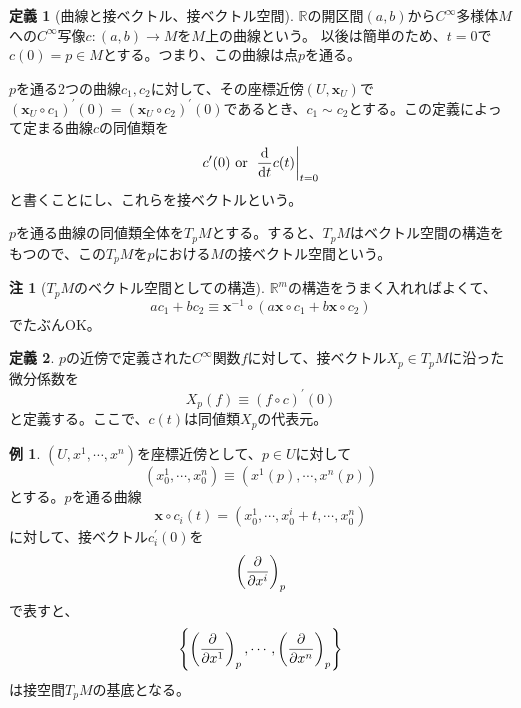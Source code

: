 \documentclass[unicode,a4paper,11pt]{ltjsarticle}
\theoremstyle{definition}
\newtheorem{dfn}{定義}[section]
\newtheorem{exm}{例}[section]
\newtheorem{rmk}{注}[section]
\begin{document}
\begin{dfn}[曲線と接ベクトル、接ベクトル空間]
  $\mathbb{R}$の開区間$(a,b)$から$C^{\infty}$多様体$M$への$C^{\infty}$写像$c:(a,b)\rightarrow M$を$M$上の曲線という。  以後は簡単のため、$t=0$で$c(0)=p\in M$とする。つまり、この曲線は点$p$を通る。

  $p$を通る2つの曲線$c_{1},c_{2}$に対して、その座標近傍$(U,\bm{x}_{U})$で$(\bm{x}_{U}\circ c_{1})^{\prime}(0)=(\bm{x}_{U}\circ c_{2})^{\prime}(0)$であるとき、$c_{1}\sim c_{2}$とする。この定義によって定まる曲線$c$の同値類を
  \begin{equation}
    c'(0)
    \mathrm{\ or\ }
    \left.\dv{}{t}c(t)\right|_{t=0}
  \end{equation}
  と書くことにし、これらを接ベクトルという。

  $p$を通る曲線の同値類全体を$T_{p}M$とする。すると、$T_{p}M$はベクトル空間の構造をもつので、この$T_{p}M$を$p$における$M$の接ベクトル空間という。
\end{dfn}

\begin{rmk}[$T_{p}M$のベクトル空間としての構造]
  \label{rmk:vector_str_TpM}
  $\mathbb{R}^{m}$の構造をうまく入れればよくて、
  \begin{equation}
    ac_{1}+bc_{2}
    \equiv
    \bm{x}^{-1}\circ(a\bm{x}\circ c_{1}+b\bm{x}\circ c_{2})
  \end{equation}
  でたぶんOK。
\end{rmk}

\begin{dfn}
  $p$の近傍で定義された$C^{\infty}$関数$f$に対して、接ベクトル$X_{p}\in T_{p}M$に沿った微分係数を
  \begin{equation}
    X_{p}(f)
    \equiv
    (f\circ c)^{\prime}(0)
  \end{equation}
  と定義する。ここで、$c(t)$は同値類$X_{p}$の代表元。
\end{dfn}

\begin{exm}
  $(U,x^{1},\cdots,x^{n})$を座標近傍として、$p\in U$に対して
  \begin{equation}
    (x_{0}^{1},\cdots,x_{0}^{n})
    \equiv
    (x^{1}(p),\cdots,x^{n}(p))
  \end{equation}
  とする。$p$を通る曲線
  \begin{equation}
    \bm{x}\circ c_{i}(t)=(x_{0}^{1},\cdots,x_{0}^{i}+t,\cdots,x_{0}^{n})
  \end{equation}
  に対して、接ベクトル$c_{i}^{\prime}(0)$を
  \begin{equation}
    \left( \pdv{}{x^{i}} \right)_{p}
  \end{equation}
  で表すと、
  \begin{equation}
    \left\{
    \left( \pdv{}{x^{1}} \right)_{p}
    ,\cdots,
    \left( \pdv{}{x^{n}} \right)_{p}
    \right\}
  \end{equation}
  は接空間$T_{p}M$の基底となる。
\end{exm}
\end{document}
